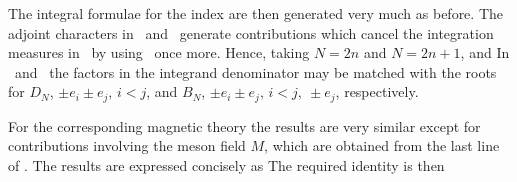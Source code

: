 The integral formulae for the index are then generated very much as before. 
The adjoint characters in \weylev\ and \weylod\ generate contributions
which cancel the integration measures in \invSO\ by using \meas\ once more.
Hence, taking $N=2n$ and $N=2n+1$,
\eqn{}
and
\eqn{}
In \indexOEe\ and \indexOEo\ the factors in the integrand denominator 
may be matched with the roots
for $D_N$, $\pm e_i \pm e_j, \,  i<j$, and $B_N$, $\pm e_i \pm e_j , \, 
i<j, \ \pm e_j$, respectively.

For the corresponding magnetic theory  the results are very similar except
for contributions involving the meson field $M$, which are obtained from
the last line of \iMO. The results are expressed concisely as 
\eqn{}
The required identity is then
\eqn{}

